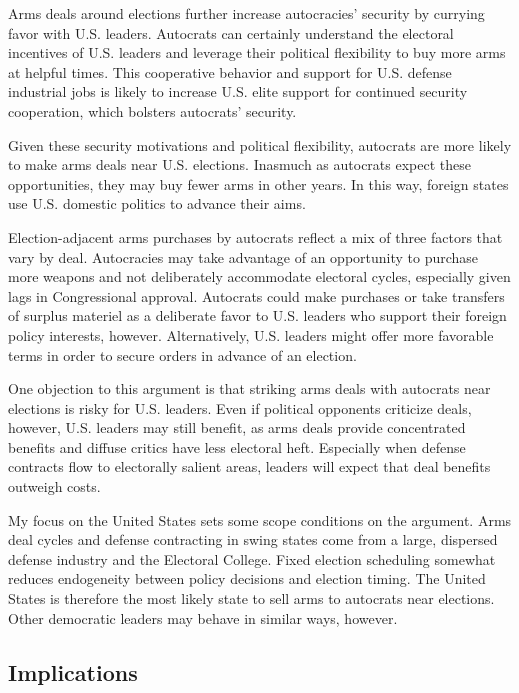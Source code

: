 \documentclass[12pt]{article}
\begin{document}
Arms deals around elections further increase autocracies' security by currying favor with U.S. leaders.
Autocrats can certainly understand the electoral incentives of U.S. leaders and leverage their political flexibility to buy more arms at helpful times. 
This cooperative behavior and support for U.S. defense industrial jobs is likely to increase U.S. elite support for continued security cooperation, which bolsters autocrats' security.


Given these security motivations and political flexibility, autocrats are more likely to make arms deals near U.S. elections.
Inasmuch as autocrats expect these opportunities, they may buy fewer arms in other years.
In this way, foreign states use U.S. domestic politics to advance their aims. 


Election-adjacent arms purchases by autocrats reflect a mix of three factors that vary by deal.
Autocracies may take advantage of an opportunity to purchase more weapons and not deliberately accommodate electoral cycles, especially given lags in Congressional approval.
Autocrats could make purchases or take transfers of surplus materiel as a deliberate favor to U.S. leaders who support their foreign policy interests, however. 
Alternatively, U.S. leaders might offer more favorable terms in order to secure orders in advance of an election.


One objection to this argument is that striking arms deals with autocrats near elections is risky for U.S. leaders. 
Even if political opponents criticize deals, however, U.S. leaders may still benefit, as arms deals provide concentrated benefits and diffuse critics have less electoral heft.
Especially when defense contracts flow to electorally salient areas, leaders will expect that deal benefits outweigh costs. 


My focus on the United States sets some scope conditions on the argument.
Arms deal cycles and defense contracting in swing states come from a large, dispersed defense industry and the Electoral College. 
Fixed election scheduling somewhat reduces endogeneity between policy decisions and election timing. 
The United States is therefore the most likely state to sell arms to autocrats near elections. 
Other democratic leaders may behave in similar ways, however.



\subsection{Implications}
\end{document}
